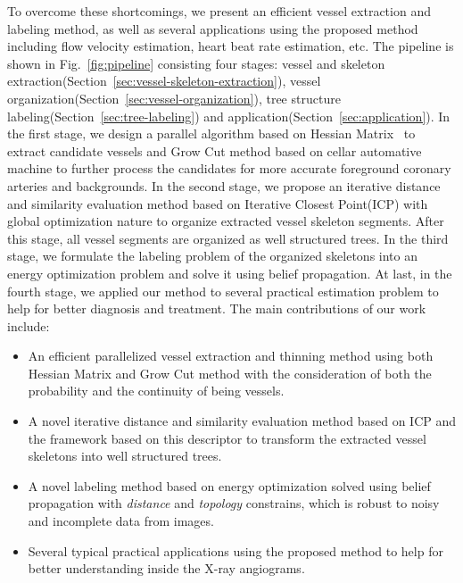 \documentclass[journal]{IEEEtran}
\begin{document}
To overcome these shortcomings, we present an efficient vessel extraction and labeling method, as well as several applications using the proposed method including flow velocity estimation, heart beat rate estimation, etc. The pipeline is shown in Fig.~\ref{fig:pipeline} consisting four stages: vessel and skeleton extraction(Section~\ref{sec:vessel-skeleton-extraction}), vessel organization(Section~\ref{sec:vessel-organization}), tree structure labeling(Section~\ref{sec:tree-labeling}) and application(Section~\ref{sec:application}). In the first stage, we design a parallel algorithm based on Hessian Matrix~\cite{Frangi} to extract candidate vessels and Grow Cut method based on cellar automative machine to further process the candidates for more accurate foreground coronary arteries and backgrounds. In the second stage, we propose an iterative distance and similarity evaluation method based on Iterative Closest Point(ICP) with global optimization nature to organize extracted vessel skeleton segments. After this stage, all vessel segments are organized as well structured trees. In the third stage, we formulate the labeling problem of the organized skeletons into an energy optimization problem and solve it using belief propagation. At last, in the fourth stage, we applied our method to several practical estimation problem to help for better diagnosis and treatment. The main contributions of our work include:
\begin{itemize}
\item An efficient parallelized vessel extraction and thinning method using both Hessian Matrix and Grow Cut method with the consideration of both the probability and the continuity of being vessels.

\item A novel iterative distance and similarity evaluation method based on ICP and the framework based on this descriptor to transform the extracted vessel skeletons into well structured trees.

\item A novel labeling method based on energy optimization solved using belief propagation with \textit{distance} and \textit{topology} constrains, which is robust to noisy and incomplete data from images.

\item Several typical practical applications using the proposed method to help for better understanding inside the X-ray angiograms.
\end{itemize}
\end{document}
